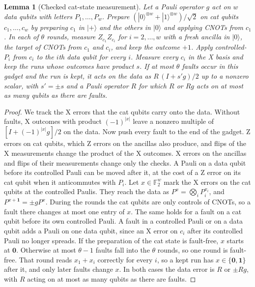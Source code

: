 \documentclass[aps,prl,reprint,twocolumn,amsmath,amssymb,floatfix,nofootinbib,superscriptaddress]{revtex4-2}
\newtheorem{lemma}[theorem]{Lemma}
\theoremstyle{definition}
\theoremstyle{remark}
\newcommand{\F}{\mathbb F_2}
\begin{document}
\begin{lemma}[Checked cat-state measurement]\label{lem:cat}
Let a Pauli operator $g$ act on $w$ data qubits with letters $P_1,\dots,P_w$. Prepare $(|0\rangle^{\otimes w}+|1\rangle^{\otimes w})/\sqrt2$ on cat qubits $c_1,\dots,c_w$ by preparing $c_1$ in $|{+}\rangle$ and the others in $|0\rangle$ and applying CNOTs from $c_1$. In each of $\theta$ rounds, measure $Z_{c_1}Z_{c_i}$ for $i=2,\dots,w$ with a fresh ancilla in $|0\rangle$, the target of CNOTs from $c_1$ and $c_i$, and keep the outcome $+1$. Apply controlled-$P_i$ from $c_i$ to the $i$th data qubit for every $i$. Measure every $c_i$ in the X basis and keep the runs whose outcomes have product $s$. If at most $\theta$ faults occur in this gadget and the run is kept, it acts on the data as $R\,(I+s'g)/2$ up to a nonzero scalar, with $s'=\pm s$ and a Pauli operator $R$ for which $R$ or $Rg$ acts on at most as many qubits as there are faults.
\end{lemma}
\begin{proof}
We track the X errors that the cat qubits carry onto the data. Without faults, X outcomes with product $(-1)^{|x|}$ leave a nonzero multiple of $[I+(-1)^{|x|}g]/2$ on the data. Now push every fault to the end of the gadget. Z errors on cat qubits, which Z errors on the ancillas also produce, and flips of the X measurements change the product of the X outcomes. X errors on the ancillas and flips of their measurements change only the checks. A Pauli on a data qubit before its controlled Pauli can be moved after it, at the cost of a Z error on its cat qubit when it anticommutes with $P_i$. Let $x\in\F^w$ mark the X errors on the cat qubits at the controlled Paulis. They reach the data as $P^x=\bigotimes_iP_i^{x_i}$, and $P^{x+\mathbf1}=\pm gP^x$. During the rounds the cat qubits are only controls of CNOTs, so a fault there changes at most one entry of $x$. The same holds for a fault on a cat qubit before its own controlled Pauli. A fault in a controlled Pauli or on a data qubit adds a Pauli on one data qubit, since an X error on $c_i$ after its controlled Pauli no longer spreads. If the preparation of the cat state is fault-free, $x$ starts at $\mathbf0$. Otherwise at most $\theta-1$ faults fall into the $\theta$ rounds, so one round is fault-free. That round reads $x_1+x_i$ correctly for every $i$, so a kept run has $x\in\{\mathbf0,\mathbf1\}$ after it, and only later faults change $x$. In both cases the data error is $R$ or $\pm Rg$, with $R$ acting on at most as many qubits as there are faults.
\end{proof}
\end{document}
